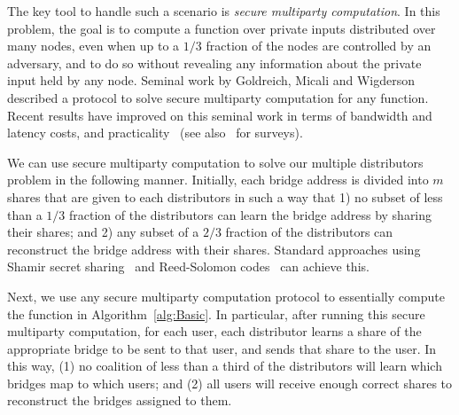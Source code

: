\documentclass{llncs}
\newcommand{\jared}[1]{}
\begin{document}
The key tool to handle such a scenario is \emph{secure multiparty computation}.  In this problem, the goal is to compute a function over private inputs distributed over many nodes, even when up to a $1/3$ fraction of the nodes are controlled by an adversary, and to do so without revealing any information about the private input held by any node.  Seminal work by Goldreich, Micali and Wigderson~\cite{Goldreich:1987:PAM:28395.28420} described a protocol to solve secure multiparty computation for any function. Recent results have improved on this seminal work in terms of bandwidth and latency costs, and practicality~\cite{boyle2015large,DKMS-ICDCN-2014,bogetoft2009secure} (see also~\cite{lindell2009secure,saia2015recent} for surveys). 

We can use secure multiparty computation to solve our multiple distributors problem in the following manner.  Initially, each bridge address is divided into $m$ shares that are given to each distributors in such a way that 1) no subset of less than a $1/3$ fraction of the distributors can learn the bridge address by sharing their shares; and 2) any subset of a $2/3$ fraction of the distributors can reconstruct the bridge address with their shares.  Standard approaches using Shamir secret sharing~\cite{shamir:how} and Reed-Solomon codes~\cite{Reed-Solomon1960} can achieve this.  

Next, we use any secure multiparty computation protocol to essentially compute the function in Algorithm~\ref{alg:Basic}.  In particular, after running this secure multiparty computation, for each user, each distributor learns a share of the appropriate bridge to be sent to that user, and sends that share to the user.  In this way, (1) no coalition of less than a third of the distributors will learn which bridges map to which users; and (2) all users will receive enough correct shares to reconstruct the bridges assigned to them.


\jared{I think it may be simplest to just give the standard secure MPC protocol here (not the leader based one).  It'll save space, and I think there's already too many ideas packed into this paper.
We first construct a \emph{leader-based protocol}, where an honest-but-curious distributor called the \emph{leader} locally runs Algorithm~\ref{alg:Basic} over anonymous bridge addresses. The leader then sends anonymous user-bridge assignments to other distributors who can collectively ``open'' the assignments for the users. }

\end{document}

